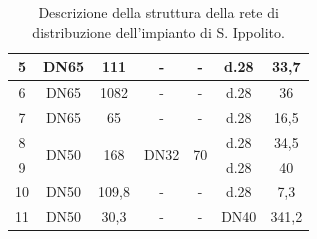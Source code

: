 \documentclass[laurea,oneside,11pt]{USiena_tesiLM3}
\begin{document}
\begin{table}[!ht]
{\begin{tabular}{|c|c|c|c|c|c|c|}
5                                             & DN65                  & 111                                    & -                         & -                     & d.28         & 33,7                      \\ \hline
6                                             & DN65                  & 1082                                   & -                         & -                     & d.28         & 36                        \\ \hline
7                                             & DN65                  & 65                                     & -                         & -                     & d.28         & 16,5                      \\ \hline
8                                             & \multirow{2}{*}{DN50} & \multirow{2}{*}{168}                   & \multirow{2}{*}{DN32}     & \multirow{2}{*}{70}   & d.28         & 34,5                      \\ \cline{1-1} \cline{6-7} 
9                                             &                       &                                        &                           &                       & d.28         & 40                        \\ \hline
10                                            & DN50                  & 109,8                                  & -                         & -                     & d.28         & 7,3                       \\ \hline
11                                            & DN50                  & 30,3                                   & -                         & -                     & DN40         & 341,2                     \\ \hline
\end{tabular}}
\caption{Descrizione della struttura della rete di distribuzione dell'impianto di S. Ippolito.}
\label{tab:rete_ippolito}
\end{table}
\end{document}
